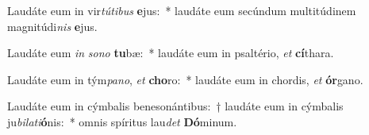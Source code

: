 \item Laudáte eum in vir\textit{tú}\textit{ti}\textit{bus} \textbf{e}jus:~* laudáte eum secúndum multitúdinem magnitúdi\textit{nis} \textbf{e}jus.
\item Laudáte eum \textit{in} \textit{so}\textit{no} \textbf{tu}bæ:~* laudáte eum in psaltério, \textit{et} \textbf{cí}thara.
\item Laudáte eum in tým\textit{pa}\textit{no}, \textit{et} \textbf{cho}ro:~* laudáte eum in chordis, \textit{et} \textbf{ór}gano.
\item Laudáte eum in cýmbalis benesonántibus:~† laudáte eum in cýmbalis ju\textit{bi}\textit{la}\textit{ti}\textbf{ó}nis:~* omnis spíritus lau\textit{det} \textbf{Dó}minum.
